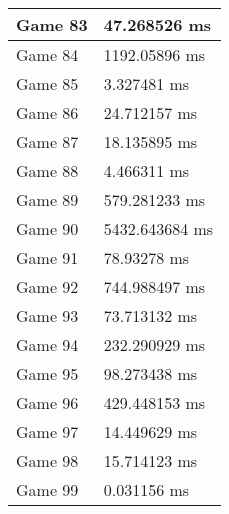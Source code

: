 \begin{tabular}{|l|l|}
	Game 83 & 47.268526 ms \\ \hline
	Game 84 & 1192.05896 ms \\ \hline
	Game 85 & 3.327481 ms \\ \hline
	Game 86 & 24.712157 ms \\ \hline
	Game 87 & 18.135895 ms \\ \hline
	Game 88 & 4.466311 ms \\ \hline
	Game 89 & 579.281233 ms \\ \hline
	Game 90 & 5432.643684 ms \\ \hline
	Game 91 & 78.93278 ms \\ \hline
	Game 92 & 744.988497 ms \\ \hline
	Game 93 & 73.713132 ms \\ \hline
	Game 94 & 232.290929 ms \\ \hline
	Game 95 & 98.273438 ms \\ \hline
	Game 96 & 429.448153 ms \\ \hline
	Game 97 & 14.449629 ms \\ \hline
	Game 98 & 15.714123 ms \\ \hline
	Game 99 & 0.031156 ms \\ \hline
\end{tabular}
